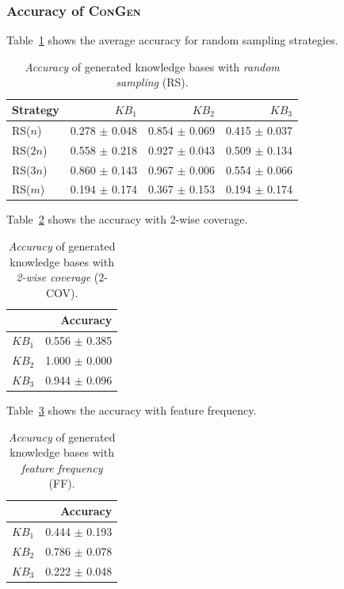 
\subsubsection{Accuracy of \textsc{ConGen}}

Table~\ref{tab:accuracy_rs} shows the average accuracy for random sampling strategies.

\begin{table}[htbp]
\centering
\caption{\textit{Accuracy} of generated knowledge bases with \textit{random sampling} (RS).}
\label{tab:accuracy_rs}
\begin{tabular}{lrrr}
\toprule
Strategy & $KB_1$ & $KB_2$ & $KB_3$ \\
\midrule
RS($n$)  & 0.278 $\pm$ 0.048 & 0.854 $\pm$ 0.069 & 0.415 $\pm$ 0.037 \\
RS($2n$) & 0.558 $\pm$ 0.218 & 0.927 $\pm$ 0.043 & 0.509 $\pm$ 0.134 \\
RS($3n$) & 0.860 $\pm$ 0.143 & 0.967 $\pm$ 0.006 & 0.554 $\pm$ 0.066 \\
RS($m$)  & 0.194 $\pm$ 0.174 & 0.367 $\pm$ 0.153 & 0.194 $\pm$ 0.174 \\
\bottomrule
\end{tabular}
\end{table}

Table~\ref{tab:accuracy_2cov} shows the accuracy with 2-wise coverage.

\begin{table}[htbp]
\centering
\caption{\textit{Accuracy} of generated knowledge bases with \textit{2-wise coverage} (2-COV).}
\label{tab:accuracy_2cov}
\begin{tabular}{lr}
\toprule
 & Accuracy \\
\midrule
$KB_1$ & 0.556 $\pm$ 0.385 \\
$KB_2$ & 1.000 $\pm$ 0.000 \\
$KB_3$ & 0.944 $\pm$ 0.096 \\
\bottomrule
\end{tabular}
\end{table}

Table~\ref{tab:accuracy_ff} shows the accuracy with feature frequency.

\begin{table}[htbp]
\centering
\caption{\textit{Accuracy} of generated knowledge bases with \textit{feature frequency} (FF).}
\label{tab:accuracy_ff}
\begin{tabular}{lr}
\toprule
 & Accuracy \\
\midrule
$KB_1$ & 0.444 $\pm$ 0.193 \\
$KB_2$ & 0.786 $\pm$ 0.078 \\
$KB_3$ & 0.222 $\pm$ 0.048 \\
\bottomrule
\end{tabular}
\end{table}

